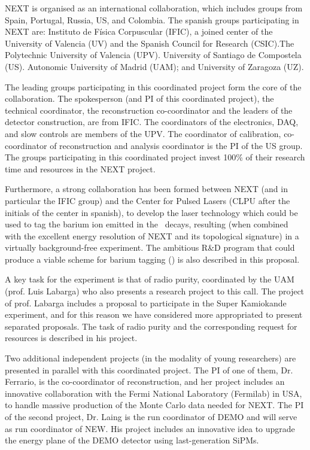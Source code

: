 NEXT is organised as an international collaboration, which includes groups from Spain, Portugal, Russia, US, and Colombia. The spanish groups participating in NEXT are: Instituto de Física Corpuscular (IFIC), a joined center of the University of Valencia (UV) and the Spanish Council for Research (CSIC).The  Polytechnic University of Valencia (UPV). University of Santiago de Compostela (US). Autonomic University of Madrid (UAM); and University of Zaragoza (UZ). 

The leading groups participating in this coordinated project form the core of the collaboration. The spokesperson (and PI of this coordinated project), the technical coordinator, the reconstruction co-coordinator and the leaders of the detector construction, are from  IFIC. The coordinators of the electronics, DAQ, and slow controls are members of the UPV. The coordinator of calibration, co-coordinator of reconstruction and analysis coordinator is the PI  of the US group. The groups participating in this coordinated project invest 100\% of their research time and resources in the NEXT project. 

Furthermore, a strong collaboration has been  formed between NEXT (and in particular the IFIC group) and the Center for Pulsed Lasers (CLPU after the initials of the center in spanish), to develop the laser technology which could be used to tag the barium ion emitted in the \bb\ decays, resulting (when combined with the excellent energy resolution of NEXT and its topological signature) in a virtually background-free experiment. The ambitious R\&D program that could produce a viable scheme for barium tagging (\BATA) is also described in this proposal.  

A key task for the experiment is that of radio purity, coordinated by the UAM (prof. Luis Labarga) who also presents a research project to this call. The project of prof. Labarga includes a proposal to participate in the Super Kamiokande experiment, and for this reason we have considered more appropriated to present separated proposals. The task of radio purity and the corresponding request for resources is described in his project.

Two additional independent projects (in the modality of young researchers) are presented in parallel with this coordinated project. The PI of one of them, Dr. Ferrario, is the co-coordinator of reconstruction, and her project includes an innovative collaboration with the Fermi National Laboratory (Fermilab) in USA, to handle massive production of the Monte Carlo data needed for NEXT. The PI of the second project, Dr. Laing is the run coordinator of DEMO and will serve as run coordinator of NEW. His project includes an innovative idea to upgrade the energy plane of the DEMO detector using last-generation SiPMs.


